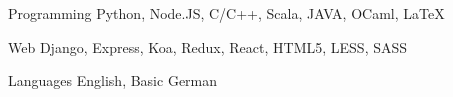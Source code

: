 

\begin{cvskills}

  \cvskill
    {Programming} %
    {Python, Node.JS, C/C++, Scala, JAVA, OCaml, LaTeX} %

  \cvskill
    {Web} %
    {Django, Express, Koa, Redux, React, HTML5, LESS, SASS} %

  \cvskill
    {Languages} %
    {English, Basic German} %

\end{cvskills}
